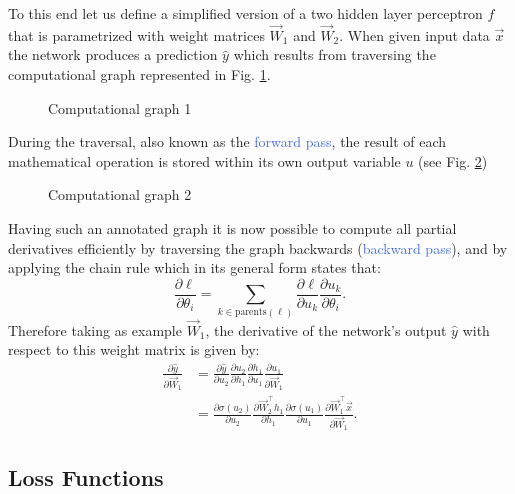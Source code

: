 To this end let us define a simplified version of a two hidden layer perceptron $f$ that is parametrized with weight matrices $\vec{W}_1$ and $\vec{W}_2$. When given input data $\vec{x}$ the network produces a prediction $\hat{y}$ which results from traversing the computational graph represented in Fig. \ref{fig:computational_graph_1}.  
\begin{figure}[ht!]
	\centering
	
\caption{Computational graph 1}
\label{fig:computational_graph_1}
\end{figure}
During the traversal, also known as the \textcolor{RoyalBlue}{forward pass}, the result of each mathematical operation is stored within its own output variable $u$ (see Fig. \ref{fig:computational_graph_2}) 
\begin{figure}[ht!]
	\centering
	
\caption{Computational graph 2}
\label{fig:computational_graph_2}
\end{figure}
Having such an annotated graph it is now possible to compute all partial derivatives efficiently by traversing the graph backwards (\textcolor{RoyalBlue}{backward pass}), and by applying the chain rule which in its general form states that:
\begin{equation}
	\frac{\partial \ell}{\partial \theta_i} = \sum_{k\in\text{parents}(\ell)} \frac{\partial \ell}{\partial u_k} \frac{\partial u_k}{\partial \theta_i}.
\end{equation}
Therefore taking as example $\vec{W}_1$, the derivative of the network's output $\hat{y}$ with respect to this weight matrix is given by:
\label{eq:general_chain_rule}
\begin{equation}
	\begin{split}
	\frac{\partial \hat{y}}{\partial \vec{W}_1} & = \frac{\partial \hat{y}}{\partial u_2} \frac{\partial u_2}{\partial h_1} \frac{\partial h_1}{\partial u_1} \frac{\partial u_1}{\partial\vec{W}_1} \\
	& = \frac{\partial\sigma(u_2)}{\partial u_2} \frac{\partial\vec{W}_2^{\intercal}h_1}{\partial h_1} \frac{\partial \sigma(u_1)}{\partial u_1} \frac{\partial \vec{W}_1^{\intercal}\vec{x}}{\partial{\vec{W}_1}}.
	\end{split}
	\label{eq:applied_chain_rule}
\end{equation}

\subsection{Loss Functions}
\label{sec:loss_functions}


